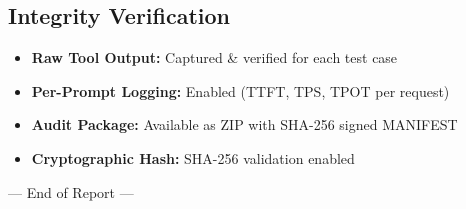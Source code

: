 \documentclass[a4paper,10pt]{article}
\begin{document}
\subsection{Integrity Verification}
\begin{itemize}[nosep]
  \item \textbf{Raw Tool Output:} Captured \& verified for each test case
  \item \textbf{Per-Prompt Logging:} Enabled (TTFT, TPS, TPOT per request)
  \item \textbf{Audit Package:} Available as ZIP with SHA-256 signed MANIFEST
  \item \textbf{Cryptographic Hash:} SHA-256 validation enabled
\end{itemize}

\begin{center}
\end{center}

\vfill
\begin{center}
  {\small\color{medgray} --- End of Report ---}
\end{center}
\end{document}
